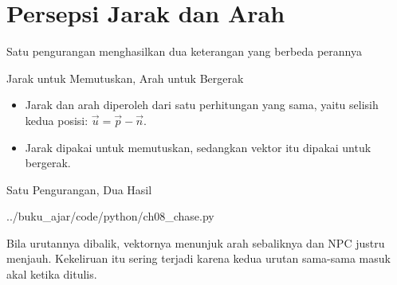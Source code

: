 \documentclass[aspectratio=169,10pt]{beamer}
\begin{document}
\section{Persepsi Jarak dan Arah}
  {Satu pengurangan menghasilkan dua keterangan yang berbeda perannya}

\begin{frame}{Jarak untuk Memutuskan, Arah untuk Bergerak}
\begin{center}
\end{center}
\vspace{-0.02cm}
\begin{itemize}
  \item Jarak dan arah diperoleh dari satu perhitungan yang sama, yaitu selisih
        kedua posisi: $\vec{u} = \vec{p} - \vec{n}$.
  \item Jarak dipakai untuk memutuskan, sedangkan vektor itu dipakai untuk
        bergerak.
\end{itemize}
\end{frame}

\begin{frame}[fragile]{Satu Pengurangan, Dua Hasil}

  {../buku_ajar/code/python/ch08_chase.py}
\vspace{0.15cm}
\begin{peringatan}
Bila urutannya dibalik, vektornya menunjuk arah sebaliknya dan NPC justru
menjauh. Kekeliruan itu sering terjadi karena kedua urutan sama-sama masuk
akal ketika ditulis.
\end{peringatan}
\end{frame}
\end{document}
